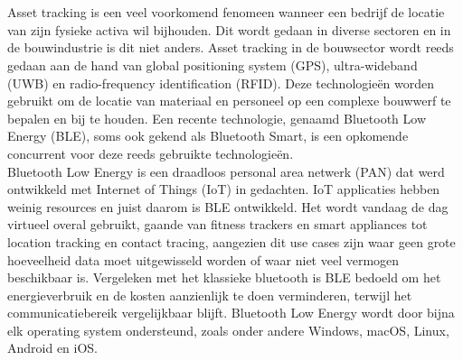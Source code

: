 
\chapter{}%
\label{ch:inleiding}

%

Asset tracking is een veel voorkomend fenomeen wanneer een bedrijf de locatie van zijn fysieke activa wil bijhouden. Dit wordt gedaan in diverse sectoren en in de bouwindustrie is dit niet anders. Asset tracking in de bouwsector wordt reeds gedaan aan de hand van global positioning system (GPS), ultra-wideband (UWB) en radio-frequency identification (RFID). Deze technologieën worden gebruikt om de locatie van materiaal en personeel op een complexe bouwwerf te bepalen en bij te houden. Een recente technologie, genaamd Bluetooth Low Energy (BLE), soms ook gekend als Bluetooth Smart, is een opkomende concurrent voor deze reeds gebruikte technologieën. \\

Bluetooth Low Energy is een draadloos personal area netwerk (PAN) dat werd ontwikkeld met Internet of Things (IoT) in gedachten. IoT applicaties hebben weinig resources en juist daarom is BLE ontwikkeld. Het wordt vandaag de dag virtueel overal gebruikt, gaande van fitness trackers en smart appliances tot location tracking en contact tracing, aangezien dit use cases zijn waar geen grote hoeveelheid data moet uitgewisseld worden of waar niet veel vermogen beschikbaar is. Vergeleken met het klassieke bluetooth is BLE bedoeld om het energieverbruik en de kosten aanzienlijk te doen verminderen, terwijl het communicatiebereik vergelijkbaar blijft. Bluetooth Low Energy wordt door bijna elk operating system ondersteund, zoals onder andere Windows, macOS, Linux,  Android en iOS.\\

